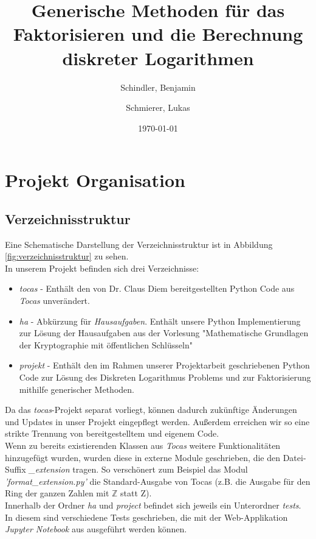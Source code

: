 \documentclass{scrartcl}
\begin{document}
\titlehead{
  Universität Leipzig \\
  Fakultät für Mathematik und Informatik \\
  Institut für Informatik
}
\subject{Projekt Dokumentation}
\title{Generische Methoden für das Faktorisieren und die Berechnung diskreter Logarithmen}
\author{Schindler, Benjamin \and Schmierer, Lukas}
\date{\today}
\publishers{Dr. Claus Diem}
\maketitle

\tableofcontents

\section{Projekt Organisation}
\label{sec:organisation}

\subsection{Verzeichnisstruktur}
\label{sec:verzeichnisstruktur}
Eine Schematische Darstellung der Verzeichnisstruktur ist in Abbildung \ref{fig:verzeichnisstruktur} zu sehen.\\
In unserem Projekt befinden sich drei Verzeichnisse:

\begin{itemize}
\item \emph{tocas} - Enthält den von Dr. Claus Diem bereitgestellten Python Code aus \emph{Tocas} \cite{tocas} unverändert.

\item \emph{ha} - Abkürzung für \emph{Hausaufgaben}. Enthält unsere Python Implementierung zur Lösung der Hausaufgaben aus der Vorlesung "Mathematische Grundlagen der Kryptographie mit öffentlichen Schlüsseln"
\item \emph{projekt} - Enthält den im Rahmen unserer Projektarbeit geschriebenen Python Code zur Lösung des Diskreten Logarithmus Problems und zur Faktorisierung mithilfe generischer Methoden.
\end{itemize}
Da das \emph{tocas}-Projekt separat vorliegt, können dadurch zukünftige Änderungen und Updates in unser Projekt eingepflegt werden. Außerdem erreichen wir so eine strikte Trennung von bereitgestelltem und eigenem Code.\\
Wenn zu bereits existierenden Klassen aus \emph{Tocas} weitere Funktionalitäten hinzugefügt wurden, wurden diese in externe Module geschrieben, die den Datei-Suffix \emph{\_extension} tragen. So verschönert zum Beispiel das Modul \emph{'format\_extension.py'} die Standard-Ausgabe von Tocas (z.B. die Ausgabe für den Ring der ganzen Zahlen mit \( \mathbb{Z} \) statt Z). \\
Innerhalb der Ordner \emph{ha} und \emph{project} befindet sich jeweils ein Unterordner \emph{tests}. In diesem sind verschiedene Tests geschrieben, die mit der Web-Applikation \emph{Jupyter Notebook} aus \cite{jupyterNotebook} ausgeführt werden können.
\end{document}
